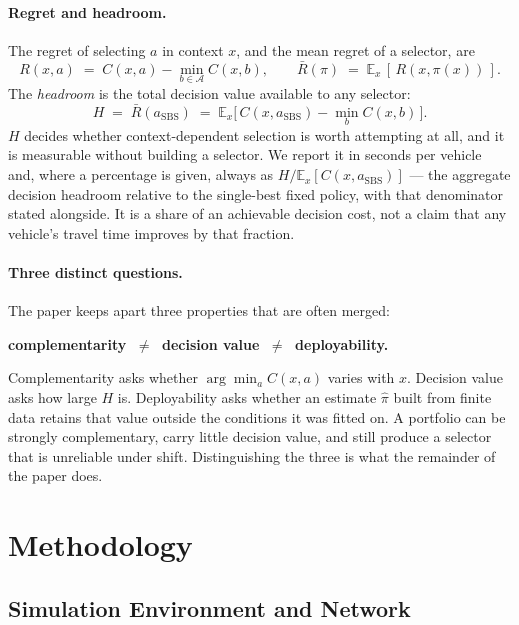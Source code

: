 \documentclass[runningheads]{llncs}
\begin{document}
\paragraph{Regret and headroom.}
The regret of selecting $a$ in context $x$, and the mean regret of a selector,
are
\begin{equation}
R(x,a) \;=\; C(x,a) - \min_{b \in \mathcal{A}} C(x,b),
\qquad
\bar{R}(\pi) \;=\; \mathbb{E}_x\,[\,R(x,\pi(x))\,].
\end{equation}
The \emph{headroom} is the total decision value available to any selector:
\begin{equation}
H \;=\; \bar{R}(a_{\mathrm{SBS}})
   \;=\; \mathbb{E}_x\big[\,C(x,a_{\mathrm{SBS}}) - \min_b C(x,b)\,\big].
\label{eq:headroom}
\end{equation}
$H$ decides whether context-dependent selection is worth attempting at all, and
it is measurable without building a selector. We report it in seconds per
vehicle and, where a percentage is given, always as
$H / \mathbb{E}_x[C(x,a_{\mathrm{SBS}})]$ --- the aggregate decision headroom
relative to the single-best fixed policy, with that denominator stated
alongside. It is a share of an achievable decision cost, not a claim that any
vehicle's travel time improves by that fraction.

\paragraph{Three distinct questions.}
The paper keeps apart three properties that are often merged:
\begin{center}
\textbf{complementarity} $\;\neq\;$ \textbf{decision value} $\;\neq\;$
\textbf{deployability.}
\end{center}
Complementarity asks whether $\arg\min_a C(x,a)$ varies with $x$. Decision value
asks how large $H$ is. Deployability asks whether an estimate $\hat{\pi}$ built
from finite data retains that value outside the conditions it was fitted on. A
portfolio can be strongly complementary, carry little decision value, and still
produce a selector that is unreliable under shift. Distinguishing the three is
what the remainder of the paper does.

\section{Methodology}

\subsection{Simulation Environment and Network}
\end{document}
